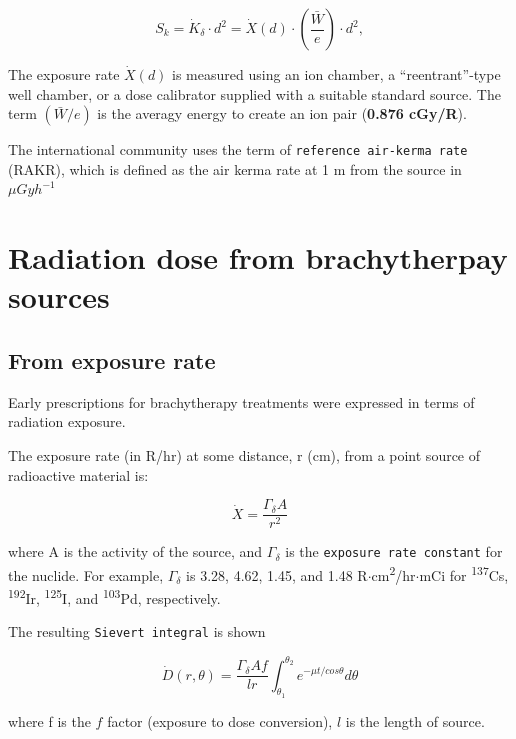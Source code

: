 \documentclass[]{book}
\theoremstyle{definition}
\theoremstyle{definition}
\theoremstyle{definition}
\theoremstyle{remark}
\begin{document}
\begin{equation}
  S_k =\dot K_\delta \cdot d^2 = \dot X(d) \cdot  \left( \frac{\bar W}{e}\right) \cdot d^2 ,
  \label{eq:sk}
\end{equation}

The exposure rate \(\dot X(d)\) is measured using an ion chamber, a
``reentrant''-type well chamber, or a dose calibrator supplied with a
suitable standard source. The term \(({\bar W}/e )\) is the averagy
energy to create an ion pair (\textbf{0.876 cGy/R}).

The international community uses the term of
\texttt{reference\ air-kerma\ rate} (RAKR), which is defined as the air
kerma rate at 1 m from the source in \(\mu Gy h^{-1}\)

\section{Radiation dose from brachytherpay
sources}\label{radiation-dose-from-brachytherpay-sources}

\subsection{From exposure rate}\label{from-exposure-rate}

Early prescriptions for brachytherapy treatments were expressed in terms
of radiation exposure.

The exposure rate (in R/hr) at some distance, r (cm), from a point
source of radioactive material is:

\begin{equation}
   \dot X = \frac{\Gamma_{\delta}A}{r^2}
   \label{eq:exposure}
\end{equation}

where A is the activity of the source, and \(\Gamma_{\delta}\) is the
\texttt{exposure\ rate\ constant} for the nuclide. For example,
\(\Gamma_{\delta}\) is 3.28, 4.62, 1.45, and 1.48
R\(\cdot\)cm\textsuperscript{2}/hr\(\cdot\)mCi for
\textsuperscript{137}Cs, \textsuperscript{192}Ir,
\textsuperscript{125}I, and \textsuperscript{103}Pd, respectively.

The resulting \texttt{Sievert\ integral} is shown

\begin{equation}
   \dot D(r, \theta) = \frac{\Gamma_{\delta}Af}{lr}\int^{\theta_2}_{\theta_1}e^{-\mu t/cos{\theta}}d\theta
\end{equation}

where f is the \(f\) factor (exposure to dose conversion), \(l\) is the
length of source.
\end{document}
